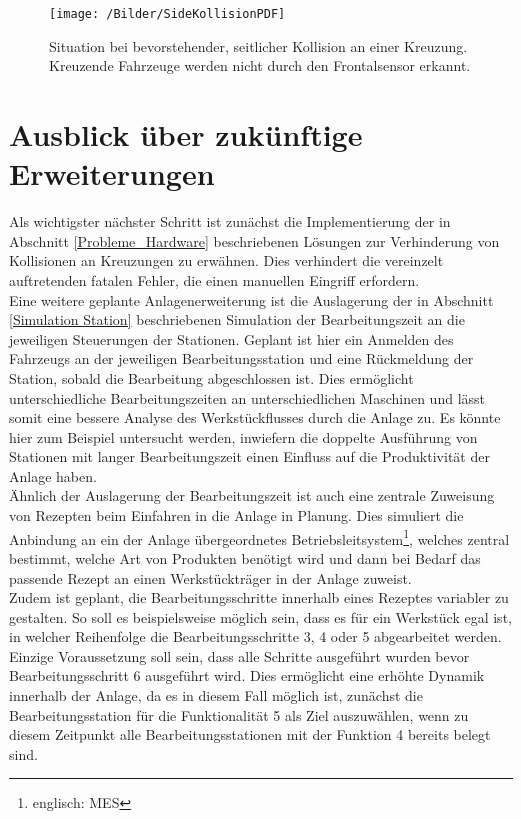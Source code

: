 		\begin{figure}[h]
			\centering
			\texttt{[image: /Bilder/SideKollisionPDF]}
			\vspace{0.2cm}
			\caption{Situation bei bevorstehender, seitlicher Kollision an einer Kreuzung. Kreuzende Fahrzeuge werden nicht durch den Frontalsensor erkannt.}\label{SideKollision}
		\end{figure}
	
\section{Ausblick über zukünftige Erweiterungen}
	
	Als wichtigster nächster Schritt ist zunächst die Implementierung der in Abschnitt \ref{Probleme_Hardware} beschriebenen Lösungen zur Verhinderung von Kollisionen an Kreuzungen zu erwähnen. Dies verhindert die vereinzelt auftretenden fatalen Fehler, die einen manuellen Eingriff erfordern.\\
	Eine weitere  geplante Anlagenerweiterung ist die Auslagerung der in Abschnitt \ref{Simulation Station} beschriebenen Simulation der Bearbeitungszeit an die jeweiligen Steuerungen der Stationen. Geplant ist hier ein Anmelden des Fahrzeugs an der jeweiligen Bearbeitungsstation und eine Rückmeldung der Station, sobald die Bearbeitung abgeschlossen ist. Dies ermöglicht unterschiedliche Bearbeitungszeiten an unterschiedlichen Maschinen und lässt somit eine bessere Analyse des Werkstückflusses durch die Anlage zu. Es könnte hier zum Beispiel untersucht werden, inwiefern die doppelte Ausführung von Stationen mit langer Bearbeitungszeit einen Einfluss auf die Produktivität der Anlage haben.
	\\[4pt]
	Ähnlich der Auslagerung der Bearbeitungszeit ist auch eine zentrale Zuweisung von Rezepten beim Einfahren in die Anlage in Planung. Dies simuliert die Anbindung an ein der Anlage übergeordnetes Betriebsleitsystem\footnote{englisch: \ac{MES}}, welches zentral bestimmt, welche Art von Produkten benötigt wird und dann bei Bedarf das passende Rezept an einen Werkstückträger in der Anlage zuweist.
	\\[4pt]
	Zudem ist geplant, die Bearbeitungsschritte innerhalb eines Rezeptes variabler zu gestalten. So soll es beispielsweise möglich sein, dass es für ein Werkstück egal ist, in welcher Reihenfolge die  Bearbeitungsschritte 3, 4 oder 5 abgearbeitet werden. Einzige Voraussetzung soll sein, dass alle Schritte ausgeführt wurden bevor Bearbeitungsschritt 6 ausgeführt wird. Dies ermöglicht eine erhöhte Dynamik innerhalb der Anlage, da es in diesem Fall möglich ist, zunächst die Bearbeitungsstation für die Funktionalität 5 als Ziel auszuwählen, wenn zu diesem Zeitpunkt alle Bearbeitungsstationen mit der Funktion 4 bereits belegt sind.
